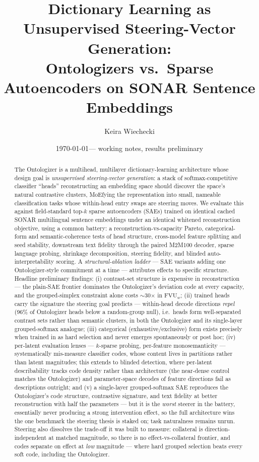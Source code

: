 \documentclass[11pt]{article}
\title{Dictionary Learning as Unsupervised Steering-Vector Generation:\\
Ontologizers vs.\ Sparse Autoencoders on SONAR Sentence Embeddings}
\author[1]{Keira Wiechecki}
\affil[1]{Wakaru Labs \\
	\texttt{kaw504@nyu.edu}}
\date{\today --- working notes, results preliminary}
\newcommand{\fvu}{\mathrm{FVU}_w}
\begin{document}
\maketitle

\begin{abstract}
The Ontologizer is a multihead, multilayer dictionary-learning
architecture whose design goal is \emph{unsupervised steering-vector
generation}: a stack of softmax-competitive classifier ``heads''
reconstructing an embedding space should discover the space's natural
contrastive clusters, MoEfying the representation into small, nameable
classification tasks whose within-head entry swaps are steering moves. We
evaluate this against field-standard top-$k$ sparse autoencoders (SAEs)
trained on identical cached SONAR multilingual sentence embeddings under
an identical whitened reconstruction objective, using a common battery:
a reconstruction-vs-capacity Pareto, categorical-form and
semantic-coherence tests of head structure, cross-model feature splitting
and seed stability, downstream text fidelity through the paired M2M100
decoder, sparse language probing, shrinkage decomposition, steering
fidelity, and blinded auto-interpretability scoring. A
\emph{structural-ablation ladder} --- SAE variants adding one
Ontologizer-style commitment at a time --- attributes effects to specific
structure. Headline preliminary findings: (i) contrast-set structure is
expensive in reconstruction --- the plain-SAE frontier dominates the
Ontologizer's deviation code at every capacity, and the grouped-simplex
constraint alone costs $\sim$30$\times$ in $\fvu$; (ii) trained heads
carry the signature the steering goal predicts --- within-head decode
directions \emph{repel} (96\% of Ontologizer heads below a random-group
null), i.e.\ heads form well-separated contrast sets rather than semantic
clusters, in both the Ontologizer and its single-layer grouped-softmax
analogue; (iii) categorical (exhaustive/exclusive) form exists precisely
when trained in as hard selection and never emerges spontaneously or post
hoc; (iv) per-latent evaluation lenses --- $k$-sparse probing,
per-feature monosemanticity --- systematically mis-measure classifier
codes, whose content lives in partitions rather than latent magnitudes;
this extends to blinded detection, where per-latent describability tracks
code density rather than architecture (the near-dense control matches the
Ontologizer) and parameter-space decodes of feature directions fail as
descriptions outright; and (v) a single-layer grouped-softmax SAE
reproduces the Ontologizer's
code structure, contrastive signature, and text fidelity at better
reconstruction with half the parameters --- but it is the \emph{worst}
steerer in the battery, essentially never producing a strong intervention
effect, so the full architecture wins the one benchmark the steering
thesis is staked on; task naturalness remains unrun. Steering also
dissolves the trade-off it was built to measure: collateral is
direction-independent at matched magnitude, so there is no
effect-vs-collateral frontier, and codes separate on effect at \emph{low}
magnitude --- where hard grouped selection beats every soft code,
including the Ontologizer.
\end{abstract}
\end{document}
